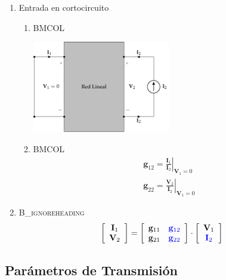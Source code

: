 \begin{enumerate}
\item Entrada en cortocircuito
\label{sec:org5a8ad67}

\begin{enumerate}
\item \hfill{}\textsc{BMCOL}
\label{sec:org71212cd}
\begin{center}
\includegraphics[height=4cm]{../figs/parametrosG_salida.pdf}
\end{center}

\item \hfill{}\textsc{BMCOL}
\label{sec:org0f2ee52}
\renewcommand{\arraystretch}{2}
\[
  \begin{array}{c}
    \mathbf{g}_{12} = \left.\frac{\mathbf{I}_1}{\mathbf{I}_2}\right\rvert_{\mathbf{V}_1 = 0}\\
    \mathbf{g}_{22} = \left.\frac{\mathbf{V}_2}{\mathbf{I}_2}\right\rvert_{\mathbf{V}_1 = 0}
  \end{array}
\]
\end{enumerate}

\item \hfill{}\textsc{B\_ignoreheading}
\label{sec:org5b626bc}
\[
  \left[
    \begin{array}{c}
      \mathbf{I}_1\\
      \mathbf{V}_2
    \end{array}
  \right] =
  \left[
    \begin{array}{cc}
      \mathbf{g}_{11} & \color{blue}{\mathbf{g}_{12}}\\
      \mathbf{g}_{21} & \color{blue}{\mathbf{g}_{22}}
    \end{array}
  \right] \cdot
  \left[
    \begin{array}{c}
      \mathbf{V}_1\\
      \color{blue}{\mathbf{I}_2}
    \end{array}
  \right]
\]
\end{enumerate}


\subsection{Parámetros de Transmisión}
\label{sec:orgd5598b8}

